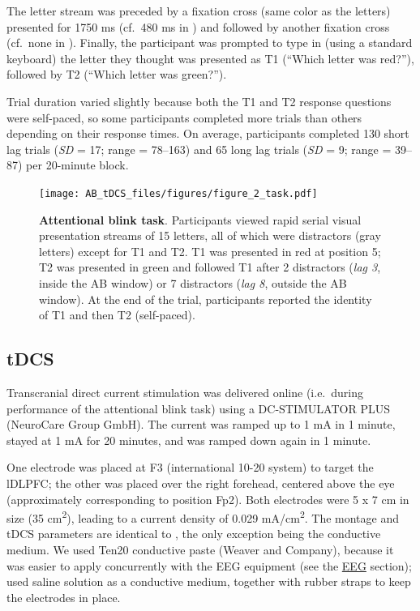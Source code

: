 \documentclass[11pt,]{memoir}
\begin{document}
The letter stream was preceded by a fixation cross (same color as the letters) presented for 1750 ms (cf.~480 ms in \textcite{London2015}) and followed by another fixation cross (cf.~none in \textcite{London2015}). Finally, the participant was prompted to type in (using a standard keyboard) the letter they thought was presented as T1 (``Which letter was red?''), followed by T2 (``Which letter was green?'').

Trial duration varied slightly because both the T1 and T2 response questions were self-paced, so some participants completed more trials than others depending on their response times. On average, participants completed 130 short lag trials (\emph{SD} = 17; range = 78--163) and 65 long lag trials (\emph{SD} = 9; range = 39--87) per 20-minute block.

\begin{figure}
\centering
\texttt{[image: AB\_tDCS\_files/figures/figure\_2\_task.pdf]}
\caption{\label{fig:AB-tDCS-fig-task}\textbf{Attentional blink task}. Participants viewed rapid serial visual presentation streams of 15 letters, all of which were distractors (gray letters) except for T1 and T2. T1 was presented in red at position 5; T2 was presented in green and followed T1 after 2 distractors (\emph{lag 3}, inside the AB window) or 7 distractors (\emph{lag 8}, outside the AB window). At the end of the trial, participants reported the identity of T1 and then T2 (self-paced).}
\end{figure}



\hypertarget{AB_tDCS-tDCS}{%
\subsection{tDCS}\label{AB_tDCS-tDCS}}

Transcranial direct current stimulation was delivered online (i.e.~during performance of the attentional blink task) using a DC-STIMULATOR PLUS (NeuroCare Group GmbH). The current was ramped up to 1 mA in 1 minute, stayed at 1 mA for 20 minutes, and was ramped down again in 1 minute.

One electrode was placed at F3 (international 10-20 system) to target the lDLPFC; the other was placed over the right forehead, centered above the eye (approximately corresponding to position Fp2). Both electrodes were 5 x 7 cm in size (35 cm\textsuperscript{2}), leading to a current density of 0.029 mA/cm\textsuperscript{2}. The montage and tDCS parameters are identical to \textcite{London2015}, the only exception being the conductive medium. We used Ten20 conductive paste (Weaver and Company), because it was easier to apply concurrently with the EEG equipment (see the \protect\hyperlink{AB_tDCS-EEGdata}{EEG} section); \textcite{London2015} used saline solution as a conductive medium, together with rubber straps to keep the electrodes in place.
\end{document}
